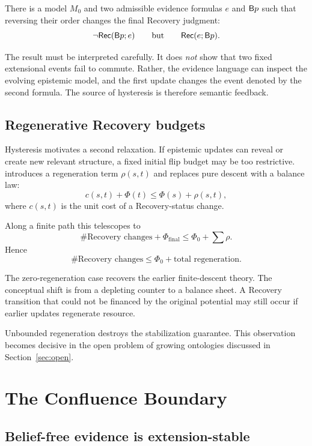 \begin{proposition}
There is a model $M_0$ and two admissible evidence formulas $e$ and $\mathsf{B} p$ such that reversing their order changes the final Recovery judgment:
\[
\neg\mathsf{Rec}(\mathsf{B} p;e)
\qquad\text{but}\qquad
\mathsf{Rec}(e;\mathsf{B} p).
\]
\end{proposition}

The result must be interpreted carefully. It does \emph{not} show that two fixed extensional events fail to commute. Rather, the evidence language can inspect the evolving epistemic model, and the first update changes the event denoted by the second formula. The source of hysteresis is therefore semantic feedback.

\subsection{Regenerative Recovery budgets}

Hysteresis motivates a second relaxation. If epistemic updates can reveal or create new relevant structure, a fixed initial flip budget may be too restrictive.  introduces a regeneration term $\rho(s,t)$ and replaces pure descent with a balance law:
\[
 c(s,t)+\Phi(t)\leq \Phi(s)+\rho(s,t),
\]
where $c(s,t)$ is the unit cost of a Recovery-status change.

Along a finite path this telescopes to
\[
\#\text{Recovery changes}+\Phi_{\mathrm{final}}
\leq
\Phi_{0}+\sum \rho.
\]
Hence
\[
\boxed{
\#\text{Recovery changes}
\leq
\Phi_{0}+\text{total regeneration}.
}
\]

The zero-regeneration case recovers the earlier finite-descent theory. The conceptual shift is from a depleting counter to a balance sheet. A Recovery transition that could not be financed by the original potential may still occur if earlier updates regenerate resource.

Unbounded regeneration destroys the stabilization guarantee. This observation becomes decisive in the open problem of growing ontologies discussed in Section~\ref{sec:open}.

\section{The Confluence Boundary}

\subsection{Belief-free evidence is extension-stable}

